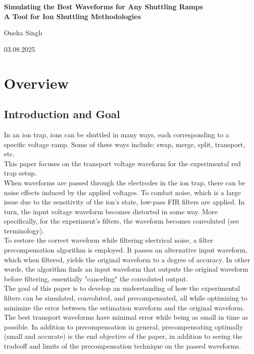 

    \nopagecolor
\begin{center}
        \text{}
	\vspace{5mm}
	\textbf{\Large Simulating the Best Waveforms for Any Shuttling Ramps\\ \normalsize A Tool for Ion Shuttling Methodologies}
	
	\vspace{19mm}
	{\normalsize Oneka Singh \\}
	\vspace{5mm}
	
	{\normalsize 03.08.2025\\}
	\vspace{10mm}
\end{center}

\newpage

\begin{flushleft}
	\tableofcontents
\end{flushleft}

\newpage

\section{Overview}
\subsection{Introduction and Goal} 

In an ion trap, ions can be shuttled in many ways, each corresponding to a specific voltage ramp. Some of these ways include: swap, merge, split, transport, etc.
\\
This paper focuses on the transport voltage waveform for the experimental red trap setup. 
\\
When waveforms are passed through the electrodes in the ion trap, there can be noise effects induced by the applied voltages. To combat noise, which is a large issue due to the sensitivity of the ion's state, low-pass FIR filters are applied. In turn, the input voltage waveform becomes distorted in some way. More specifically, for the experiment's filters, the waveform becomes convoluted (see terminology).
\\
To restore the correct waveform while filtering electrical noise, a filter precompensation algorithm is employed. It passes an alternative input waveform, which when filtered, yields the original waveform to a degree of accuracy. In other words, the algorithm finds an input waveform that outputs the original waveform before filtering, essentially "canceling" the convoluted output.
\\
The goal of this paper is to develop an understanding of how the experimental filters can be simulated, convoluted, and precompensated, all while optimizing to minimize the error between the estimation waveform and the original waveform. The best transport waveforms have minimal error while being as small in time as possible. In addition to precompensation in general, precompensating optimally (small and accurate) is the end objective of the paper, in addition to seeing the tradeoff and limits of the precompensation technique on the passed waveforms.

